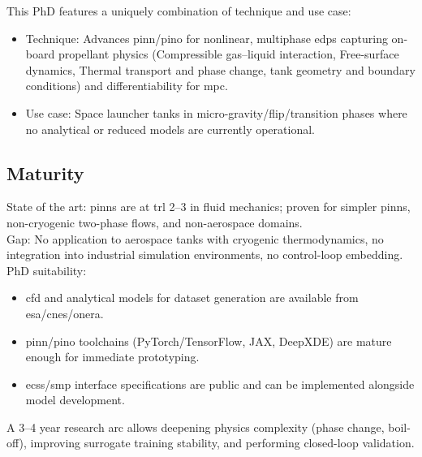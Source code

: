 \documentclass[12pt]{article}
\begin{document}
	This PhD features a uniquely combination of technique and use case:
	
	\begin{itemize}
		\item Technique: Advances \acrshort{pinn}/\acrshort{pino} for nonlinear, multiphase \acrshort{edps} capturing on-board propellant physics (Compressible gas–liquid interaction, Free-surface dynamics, Thermal transport and phase change, tank geometry and boundary conditions) and differentiability for \gls{mpc}.
		
		\item Use case: Space launcher tanks in micro-gravity/flip/transition phases where no analytical or reduced models are currently operational.
	\end{itemize}
	
	\subsection*{Maturity}
	
	
	State of the art: \acrshort{pinns} are at \acrshort{trl} 2–3 in fluid mechanics; proven for simpler \acrshort{pinns}, non-cryogenic two-phase flows, and non-aerospace domains.
	\\
	
	Gap: No application to aerospace tanks with cryogenic thermodynamics, no integration into industrial simulation environments, no control-loop embedding.
	\\
		
	PhD suitability:
	
	\begin{itemize}
		\item \acrshort{cfd} and analytical models for dataset generation are available from \acrshort{esa}/\acrshort{cnes}/\acrshort{onera}.
		
		\item \acrshort{pinn}/\acrshort{pino} toolchains (PyTorch/TensorFlow, JAX, DeepXDE) are mature enough for immediate prototyping.
		
		\item \acrshort{ecss}/\acrshort{smp} interface specifications are public and can be implemented alongside model development.
		
	\end{itemize}	
	A 3–4 year research arc allows deepening physics complexity (phase change, boil-off), improving surrogate training stability, and performing closed-loop validation.
	
\end{document}
